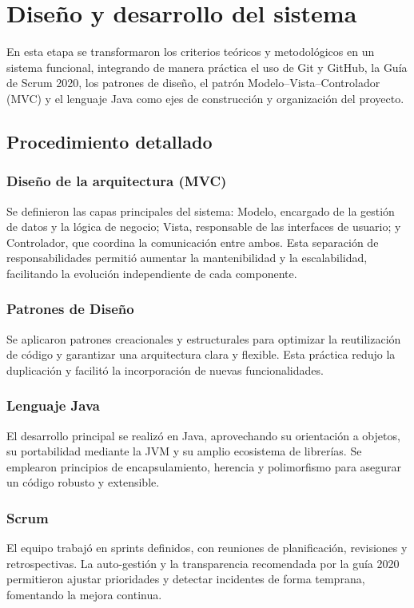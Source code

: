 \section{Diseño y desarrollo del sistema}
En esta etapa se transformaron los criterios teóricos y metodológicos en un sistema funcional, integrando de manera práctica el uso de Git y GitHub, la Guía de Scrum 2020, los patrones de diseño, el patrón Modelo–Vista–Controlador (MVC) y el lenguaje Java como ejes de construcción y organización del proyecto.

\subsection{Procedimiento detallado}
\subsubsection{Diseño de la arquitectura (MVC)}
Se definieron las capas principales del sistema: Modelo, encargado de la gestión de datos y la lógica de negocio; Vista, responsable de las interfaces de usuario; y Controlador, que coordina la comunicación entre ambos. Esta separación de responsabilidades permitió aumentar la mantenibilidad y la escalabilidad, facilitando la evolución independiente de cada componente.

\subsubsection{Patrones de Diseño}
Se aplicaron patrones creacionales y estructurales para optimizar la reutilización de código y garantizar una arquitectura clara y flexible. Esta práctica redujo la duplicación y facilitó la incorporación de nuevas funcionalidades.

\subsubsection{Lenguaje Java}
El desarrollo principal se realizó en Java, aprovechando su orientación a objetos, su portabilidad mediante la JVM y su amplio ecosistema de librerías. Se emplearon principios de encapsulamiento, herencia y polimorfismo para asegurar un código robusto y extensible.

\subsubsection{Scrum}
El equipo trabajó en sprints definidos, con reuniones de planificación, revisiones y retrospectivas. La auto-gestión y la transparencia recomendada por la guía 2020 permitieron ajustar prioridades y detectar incidentes de forma temprana, fomentando la mejora continua.

